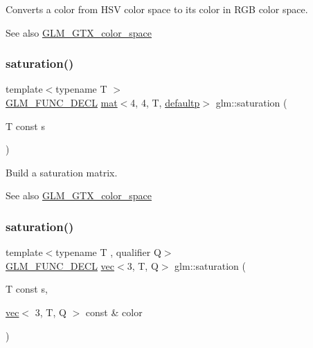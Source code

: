 Converts a color from H\+SV color space to its color in R\+GB color space. \begin{DoxySeeAlso}{See also}
\mbox{\hyperlink{group__gtx__color__space}{G\+L\+M\+\_\+\+G\+T\+X\+\_\+color\+\_\+space}} 
\end{DoxySeeAlso}
\mbox{\label{group__gtx__color__space_ga01a97152b44e1550edcac60bd849e884}} 
\subsubsection{\texorpdfstring{saturation()}{saturation()}\hspace{0.1cm}{\footnotesize\ttfamily [1/3]}}
{\footnotesize\ttfamily template$<$typename T $>$ \\
\mbox{\hyperlink{setup_8hpp_ab2d052de21a70539923e9bcbf6e83a51}{G\+L\+M\+\_\+\+F\+U\+N\+C\+\_\+\+D\+E\+CL}} \mbox{\hyperlink{structglm_1_1mat}{mat}}$<$4, 4, T, \mbox{\hyperlink{namespaceglm_a36ed105b07c7746804d7fdc7cc90ff25a9d21ccd8b5a009ec7eb7677befc3bf51}{defaultp}}$>$ glm\+::saturation (\begin{DoxyParamCaption}\item[{T const}]{s }\end{DoxyParamCaption})}

Build a saturation matrix. \begin{DoxySeeAlso}{See also}
\mbox{\hyperlink{group__gtx__color__space}{G\+L\+M\+\_\+\+G\+T\+X\+\_\+color\+\_\+space}} 
\end{DoxySeeAlso}
\mbox{\label{group__gtx__color__space_ga2156cea600e90148ece5bc96fd6db43a}} 
\subsubsection{\texorpdfstring{saturation()}{saturation()}\hspace{0.1cm}{\footnotesize\ttfamily [2/3]}}
{\footnotesize\ttfamily template$<$typename T , qualifier Q$>$ \\
\mbox{\hyperlink{setup_8hpp_ab2d052de21a70539923e9bcbf6e83a51}{G\+L\+M\+\_\+\+F\+U\+N\+C\+\_\+\+D\+E\+CL}} \mbox{\hyperlink{structglm_1_1vec}{vec}}$<$3, T, Q$>$ glm\+::saturation (\begin{DoxyParamCaption}\item[{T const}]{s,  }\item[{\mbox{\hyperlink{structglm_1_1vec}{vec}}$<$ 3, T, Q $>$ const \&}]{color }\end{DoxyParamCaption})}

